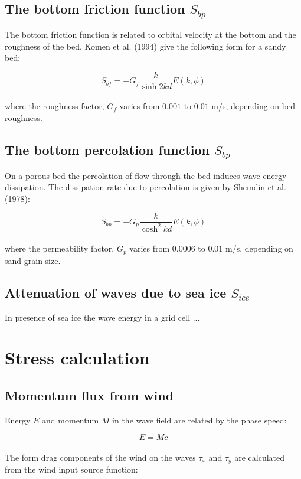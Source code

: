 \documentclass[letterpaper]{article}
\numberwithin{equation}{section}
\begin{document}
\subsection{The bottom friction function $S_{bp}$}

The bottom friction function is related to orbital velocity at the bottom and the roughness of the bed. 
Komen et al. (1994) give the following form for a sandy bed:

\begin{equation}
S_{bf}= -G_{f}\dfrac{k}{\sinh 2kd} E(k,\phi)
\label{sbf} 
\end{equation}
\\
where the roughness factor, $G_{f}$ varies from $0.001$ to $0.01$ m/s, depending on bed roughness.

\subsection{The bottom percolation function $S_{bp}$}

On a porous bed the percolation of flow through the bed induces wave energy dissipation. The dissipation rate due 
to percolation is given by Shemdin et al. (1978):

\begin{equation}
S_{bp}= -G_{p}\dfrac{k}{\cosh^{2}kd} E(k,\phi)
\label{sbp} 
\end{equation}
\\
where the permeability factor, $G_{p}$ varies from $0.0006$ to $0.01$ m/s, depending on sand grain size.

\subsection{Attenuation of waves due to sea ice $S_{ice}$}
In presence of sea ice the wave energy in a grid cell ...


\newpage
\section{Stress calculation}

\subsection{Momentum flux from wind}
\label{sec:wind_stress}

Energy $E$ and momentum $M$ in the wave field are related by the phase speed:

\begin{equation}
E=Mc
\end{equation}
\\
The form drag components of the wind on the waves $\tau_{x}$ and $\tau_{y}$ 
are calculated from the wind input source function:
\end{document}
